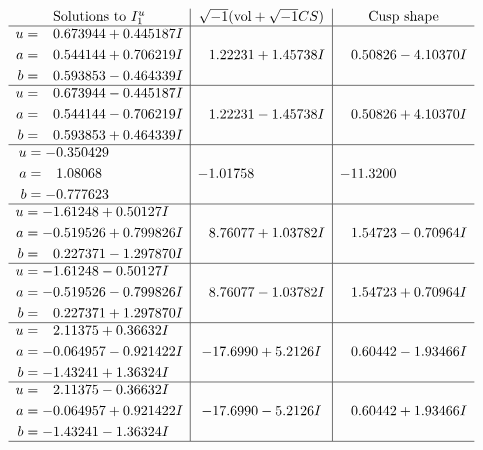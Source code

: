 \documentclass[1p]{elsarticle_modified}
\theoremstyle{definition}
\newcommand{\I}{\sqrt{-1}}
\begin{document}
$$\begin{array}{c|c|c}  
\text{Solutions to }I^u_{1}& \I (\text{vol} + \sqrt{-1}CS) & \text{Cusp shape}\\
 \hline 
\begin{aligned}
u &= \phantom{-}0.673944 + 0.445187 I \\
a &= \phantom{-}0.544144 + 0.706219 I \\
b &= \phantom{-}0.593853 - 0.464339 I\end{aligned}
 & \phantom{-}1.22231 + 1.45738 I & \phantom{-}0.50826 - 4.10370 I \\ \hline\begin{aligned}
u &= \phantom{-}0.673944 - 0.445187 I \\
a &= \phantom{-}0.544144 - 0.706219 I \\
b &= \phantom{-}0.593853 + 0.464339 I\end{aligned}
 & \phantom{-}1.22231 - 1.45738 I & \phantom{-}0.50826 + 4.10370 I \\ \hline\begin{aligned}
u &= -0.350429\phantom{ +0.000000I} \\
a &= \phantom{-}1.08068\phantom{ +0.000000I} \\
b &= -0.777623\phantom{ +0.000000I}\end{aligned}
 & -1.01758\phantom{ +0.000000I} & -11.3200\phantom{ +0.000000I} \\ \hline\begin{aligned}
u &= -1.61248 + 0.50127 I \\
a &= -0.519526 + 0.799826 I \\
b &= \phantom{-}0.227371 - 1.297870 I\end{aligned}
 & \phantom{-}8.76077 + 1.03782 I & \phantom{-}1.54723 - 0.70964 I \\ \hline\begin{aligned}
u &= -1.61248 - 0.50127 I \\
a &= -0.519526 - 0.799826 I \\
b &= \phantom{-}0.227371 + 1.297870 I\end{aligned}
 & \phantom{-}8.76077 - 1.03782 I & \phantom{-}1.54723 + 0.70964 I \\ \hline\begin{aligned}
u &= \phantom{-}2.11375 + 0.36632 I \\
a &= -0.064957 - 0.921422 I \\
b &= -1.43241 + 1.36324 I\end{aligned}
 & -17.6990 + 5.2126 I & \phantom{-}0.60442 - 1.93466 I \\ \hline\begin{aligned}
u &= \phantom{-}2.11375 - 0.36632 I \\
a &= -0.064957 + 0.921422 I \\
b &= -1.43241 - 1.36324 I\end{aligned}
 & -17.6990 - 5.2126 I & \phantom{-}0.60442 + 1.93466 I\\
 \hline 
 \end{array}$$\newpage\newpage\renewcommand{\arraystretch}{1}
\end{document}
